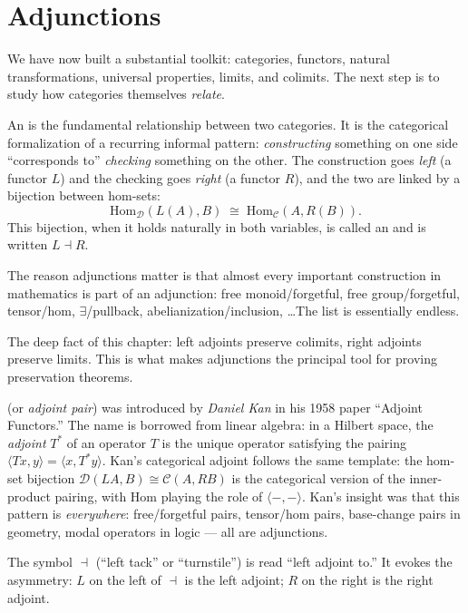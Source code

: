\chapter{Adjunctions}

\begin{overviewbox}
We have now built a substantial toolkit: categories, functors, natural
transformations, universal properties, limits, and colimits. The next
step is to study how categories themselves \emph{relate}.

An  is the fundamental relationship between two
categories. It is the categorical formalization of a recurring informal
pattern: \emph{constructing} something on one side ``corresponds to''
\emph{checking} something on the other. The construction goes
\emph{left} (a functor $L$) and the checking goes \emph{right} (a functor
$R$), and the two are linked by a bijection between hom-sets:
\begin{equation*}
  \mathrm{Hom}_\mathcal{D}(L(A), B) \;\cong\; \mathrm{Hom}_\mathcal{C}(A, R(B)).
\end{equation*}
This bijection, when it holds naturally in both variables, is called an
 and is written $L \dashv R$.

The reason adjunctions matter is that almost every important construction
in mathematics is part of an adjunction: free monoid/forgetful, free
group/forgetful, tensor/hom, $\exists$/pullback, abelianization/inclusion,
\ldots The list is essentially endless.

The deep fact of this chapter: left adjoints preserve colimits, right
adjoints preserve limits. This is what makes adjunctions the principal
tool for proving preservation theorems.
\end{overviewbox}


\begin{nameorigin}
 (or \emph{adjoint pair}) was introduced by
\emph{Daniel Kan} in his 1958 paper ``Adjoint Functors.'' The name is
borrowed from linear algebra: in a Hilbert space, the \emph{adjoint}
$T^*$ of an operator $T$ is the unique operator satisfying the pairing
$\langle T x, y\rangle = \langle x, T^* y\rangle$. Kan's categorical
adjoint follows the same template: the hom-set bijection
$\mathcal{D}(LA, B) \cong \mathcal{C}(A, RB)$ is the categorical version
of the inner-product pairing, with $\mathrm{Hom}$ playing the role of
$\langle -, -\rangle$. Kan's insight was that this pattern is
\emph{everywhere}: free/forgetful pairs, tensor/hom pairs, base-change
pairs in geometry, modal operators in logic — all are adjunctions.

The symbol $\dashv$ (``left tack'' or ``turnstile'') is read ``left
adjoint to.'' It evokes the asymmetry: $L$ on the left of $\dashv$ is
the left adjoint; $R$ on the right is the right adjoint.
\end{nameorigin}

